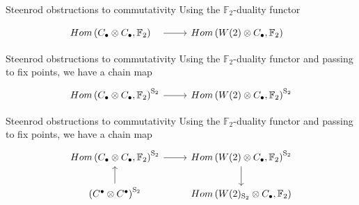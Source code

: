 \documentclass[10pt,t]{beamer}
\newcommand{\F}{\mathbb{F}}
\renewcommand{\S}{\mathrm{S}}
\begin{document}
\begin{frame}[fragile]{Steenrod obstructions to commutativity}
	Using the $\F_2$-duality functor
	\begin{equation*}
	\begin{tikzcd}
	Hom\left(C_\bullet \otimes C_\bullet, \F_2 \right)^{\phantom{\S_2}} \arrow[r] &
	Hom\left(W(2) \otimes C_\bullet, \F_2 \right)^{\phantom{\S_2}}
	\end{tikzcd}
	\end{equation*}
\end{frame}
\begin{frame}[fragile]{Steenrod obstructions to commutativity}
	Using the $\F_2$-duality functor and passing to fix points, we have a chain map 
	\begin{equation*}
	\begin{tikzcd}
	Hom\left(C_\bullet \otimes C_\bullet, \F_2 \right)^{\S_2} \arrow[r] &
	Hom\left(W(2) \otimes C_\bullet, \F_2 \right)^{\S_2}
	\end{tikzcd}
	\end{equation*}
	\addtocounter{framenumber}{-1}
\end{frame}
\begin{frame}[fragile]{Steenrod obstructions to commutativity}
	Using the $\F_2$-duality functor and passing to fix points, we have a chain map 
	\begin{equation*}
	\begin{tikzcd}
	Hom\left(C_\bullet \otimes C_\bullet, \F_2 \right)^{\S_2} \arrow[r] &
	Hom\left(W(2) \otimes C_\bullet, \F_2 \right)^{\S_2} \arrow[d] \\
	\left(C^\bullet \otimes C^\bullet\right)^{\S_2} \arrow[u] &
	Hom\left(W(2)_{\S_2} \otimes C_\bullet, \F_2 \right)
	\end{tikzcd}
	\end{equation*}
	\addtocounter{framenumber}{-1}
\end{frame}
\end{document}
